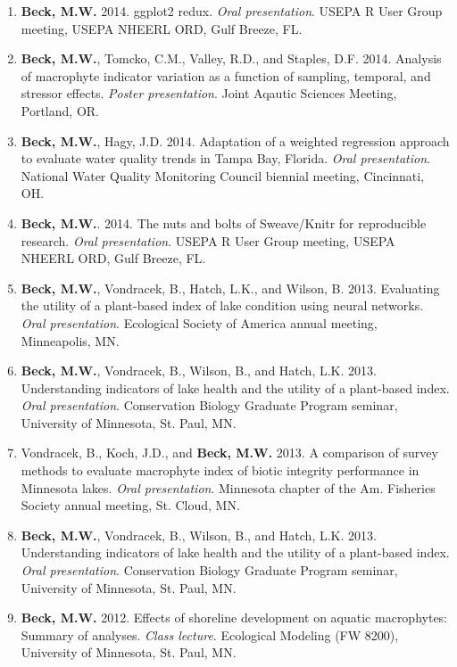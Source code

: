 \documentclass[letterpaper,12pt]{article}
\begin{document}
\begin{enumerate}
\item {\bf Beck, M.W.} 2014. ggplot2 redux. \textit{Oral presentation}. USEPA R User Group meeting, USEPA NHEERL ORD, Gulf Breeze, FL.

\item {\bf Beck, M.W.}, Tomcko, C.M., Valley, R.D., and Staples, D.F. 2014. Analysis of macrophyte indicator variation as a function of sampling, temporal, and stressor effects. \textit{Poster presentation}. Joint Aqautic Sciences Meeting, Portland, OR.

\item {\bf Beck, M.W.}, Hagy, J.D. 2014. Adaptation of a weighted regression approach to evaluate water quality trends in {T}ampa {B}ay, {F}lorida. \textit{Oral presentation}. National Water Quality Monitoring Council biennial meeting, Cincinnati, OH.

\item {\bf Beck, M.W.}. 2014. The nuts and bolts of Sweave/Knitr for reproducible research. \textit{Oral presentation}. USEPA R User Group meeting, USEPA NHEERL ORD, Gulf Breeze, FL.

\item {\bf Beck, M.W.}, Vondracek, B., Hatch, L.K., and Wilson, B. 2013. Evaluating the utility of a plant-based index of lake condition using neural networks. \textit{Oral presentation}. Ecological Society of America annual meeting, Minneapolis, MN.

\item {\bf Beck, M.W.}, Vondracek, B., Wilson, B., and Hatch, L.K. 2013. Understanding indicators of lake health and the utility of a plant-based index. \textit{Oral presentation}. Conservation Biology Graduate Program seminar, University of Minnesota, St. Paul, MN.

\item Vondracek, B., Koch, J.D., and {\bf Beck, M.W.} 2013. A comparison of survey methods to evaluate macrophyte index of biotic integrity performance in Minnesota lakes. \textit{Oral presentation}. Minnesota chapter of the Am. Fisheries Society annual meeting, St. Cloud, MN.

\item {\bf Beck, M.W.}, Vondracek, B., Wilson, B., and Hatch, L.K. 2013. Understanding indicators of lake health and the utility of a plant-based index. \textit{Oral presentation}. Conservation Biology Graduate Program seminar, University of Minnesota, St. Paul, MN.

\item {\bf Beck, M.W.} 2012. Effects of shoreline development on aquatic macrophytes: Summary of analyses. \textit{Class lecture}. Ecological Modeling (FW 8200), University of Minnesota, St. Paul, MN.


\end{enumerate}
\end{document}
